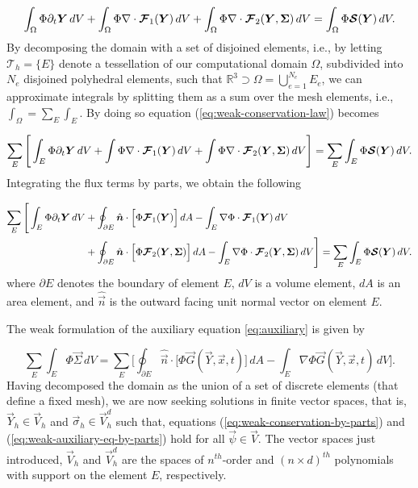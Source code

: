 \documentclass{report}
\numberwithin{equation}{section}
\begin{document}
\begin{equation}\label{eq:weak-conservation-law}
    \int_\Omega \Phi \partial_t \boldsymbol{{Y}} \, dV
    + \int_\Omega \Phi \nabla \cdot \boldsymbol{{\mathcal{F}}}_1(\boldsymbol{{Y}}) \, dV 
    + \int_\Omega \Phi \nabla \cdot \boldsymbol{{\mathcal{F}}}_2(\boldsymbol{{Y}}, \boldsymbol{{\Sigma}}) \, dV
    = \int_\Omega \Phi \boldsymbol{{\mathcal{S}}}(\boldsymbol{{Y}}) \, dV.
\end{equation}
By decomposing the domain with a set of disjoined elements, i.e., by letting $\mathcal{T}_h = \lbrace E \rbrace$ denote a tessellation of our computational domain $\Omega$, subdivided into $N_e$ disjoined polyhedral elements, such that $\mathbb{R}^3\supset\Omega = \bigcup_{e=1}^{N_e}E_e$, we can approximate integrals by splitting them as a sum over the mesh elements, i.e., $\int_\Omega = \sum_{E} \int_{E}$. By doing so equation (\ref{eq:weak-conservation-law}) becomes

\begin{align}
    \sum_E \Bigg[ \int_E \Phi \partial_t \boldsymbol{{Y}} \, dV
    + \int \Phi \nabla \cdot \boldsymbol{{\mathcal{F}}}_1(\boldsymbol{{Y}}) \, dV
    + \int \Phi \nabla \cdot \boldsymbol{{\mathcal{F}}}_2(\boldsymbol{{Y}}, \boldsymbol{{\Sigma}}) \, dV \Bigg]
    = \sum_{E} \int_{E} \Phi \boldsymbol{{\mathcal{S}}}(\boldsymbol{{Y}}) \, dV.
\end{align}
Integrating the flux terms by parts, we obtain the following

\begin{align}\label{eq:weak-conservation-by-parts}
    \sum_{E} \Bigg[ \int_E \Phi \partial_t \boldsymbol{{Y}} \, dV 
    & + \oint_{\partial E} \hat {\boldsymbol{{n}}} \cdot \Big[ \Phi \boldsymbol{{\mathcal{F}}}_1(\boldsymbol{{Y}}) \Big] \, dA 
    - \int_E \nabla \Phi \cdot \boldsymbol{{\mathcal{F}}}_1(\boldsymbol{{Y}}) \, dV  \nonumber \\
    & + \oint_{\partial E} \hat {\boldsymbol{{n}}} \cdot \Big[ \Phi \boldsymbol{{\mathcal{F}}}_2(\boldsymbol{{Y}}, \boldsymbol{{\Sigma}}) \Big] \, dA
    - \int_E \nabla \Phi \cdot \boldsymbol{{\mathcal{F}}}_2(\boldsymbol{{Y}}, \boldsymbol{{\Sigma}}) \, dV \Bigg]
    = \sum_{E} \int_E \Phi \boldsymbol{{\mathcal{S}}}(\boldsymbol{{Y}}) \, dV. 
\end{align}
where $\partial E$ denotes the boundary of element $E$, $dV$ is a volume element, $dA$ is an area element, and $\hat{\vec n }$ is the outward facing unit normal vector on element $E$. 

The weak formulation of the auxiliary equation \eqref{eq:auxiliary} is given by

\begin{equation}\label{eq:weak-auxiliary-eq-by-parts}
    \sum_{E} \int_E \Phi \vec \Sigma \, dV
    = \sum_{E} \Bigg[ \oint_{\partial E} \hat {\vec n} \cdot \bigl[\Phi \vec G(\vec Y, \vec x, t)\bigr] \, dA
    - \int_E \nabla \Phi \vec G(\vec Y, \vec x, t) \, dV \Bigg].
\end{equation}
Having decomposed the domain as the union of a set of discrete elements (that define a fixed mesh), we are now seeking solutions in finite vector spaces, that is, $\vec{Y}_h \in \vec{V}_h$ and $\vec{\sigma}_h \in \vec{V}_h^d$ such that, equations (\ref{eq:weak-conservation-by-parts}) and (\ref{eq:weak-auxiliary-eq-by-parts}) hold for all $\vec{\psi} \in \vec{V}$. The vector spaces just introduced, $\vec{V}_h$ and $\vec{V}_h^d$ are the spaces of $n^{th}$-order and $(n\times d)^{th}$ polynomials with support on the element $E$, respectively. 
\end{document}
